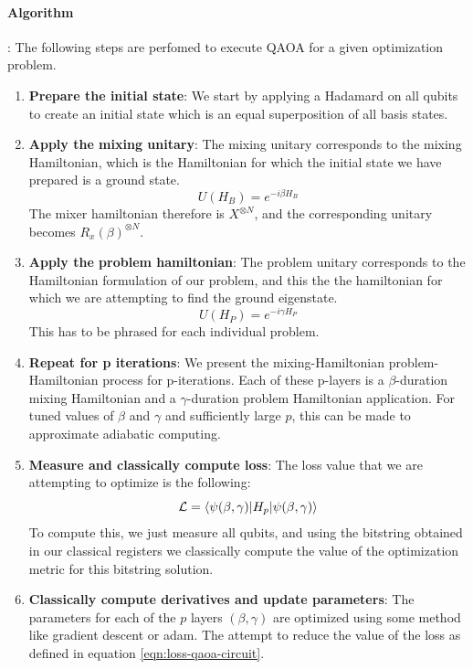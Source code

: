 \paragraph*{Algorithm}: The following steps are perfomed to execute QAOA for a given optimization problem.
\begin{enumerate}
    \item \textbf{Prepare the initial state}: We start by applying a Hadamard on all qubits to create an initial state which is an equal superposition of all basis states.
    \item \textbf{Apply the mixing unitary}: The mixing unitary corresponds to the mixing Hamiltonian, which is the Hamiltonian for which the initial state we have prepared is a ground state.
    \begin{equation}
        U(H_B) = e^{-i \beta H_B}
    \end{equation}
    The mixer hamiltonian therefore is $X^{\otimes N}$, and the corresponding unitary becomes $R_x(\beta)^{\otimes N}$.
    \item \textbf{Apply the problem hamiltonian}: The problem unitary corresponds to the Hamiltonian formulation of our problem, and this the the hamiltonian for which we are attempting to find the ground eigenstate.
    \begin{equation}
        U(H_P) = e^{-i \gamma H_P}
    \end{equation}
    This has to be phrased for each individual problem.
    \item \textbf{Repeat for p iterations}: We present the mixing-Hamiltonian problem-Hamiltonian process for p-iterations. Each of these p-layers is a $\beta$-duration mixing Hamiltonian and a $\gamma$-duration problem Hamiltonian application. For tuned values of $\beta$ and $\gamma$ and sufficiently large $p$, this can be made to approximate adiabatic computing.
    \item \textbf{Measure and classically compute loss}: The loss value that we are attempting to optimize is the following:
    \begin{equation}\label{eqn:loss-qaoa-circuit}
        \mathcal{L} = \braket{\psi(\beta, \gamma) \vert H_p \vert \psi(\beta, \gamma)}
    \end{equation}
    To compute this, we just measure all qubits, and using the bitstring obtained in our classical registers we classically compute the value of the optimization metric for this bitstring solution.
    \item \textbf{Classically compute derivatives and update parameters}: The parameters for each of the $p$ layers $(\beta, \gamma)$ are optimized using some method like gradient descent or adam. The attempt to reduce the value of the loss as defined in equation \ref{eqn:loss-qaoa-circuit}.
\end{enumerate}

